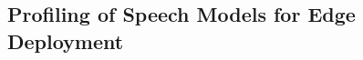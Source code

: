 \documentclass[manuscript,]{acmart} %
\begin{document}
\subsection{Profiling of Speech Models for Edge Deployment}
\end{document}
